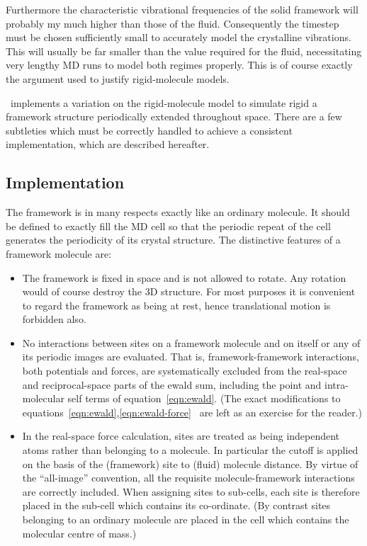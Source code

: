 Furthermore the characteristic vibrational frequencies of the solid
framework will probably my much higher than those of the fluid.
Consequently the timestep must be chosen sufficiently small to
accurately model the crystalline vibrations.  This will usually be far
smaller than the value required for the fluid, necessitating very
lengthy MD runs to model both regimes properly.  This is of course
exactly the argument used to justify rigid-molecule models. 

\moldy\ implements a variation on the rigid-molecule model to simulate
rigid a framework structure periodically extended throughout space.
There are a few subtleties which must be correctly handled to achieve
a consistent implementation, which are described hereafter.  

\subsection{Implementation}
The framework is in many respects exactly like an ordinary molecule.
It should be defined to exactly fill the MD cell so that the
periodic repeat of the cell generates the periodicity of its
crystal structure.  The distinctive features of a framework molecule are:
\begin{itemize}
\item The framework is fixed in space and is not allowed to rotate. 
Any rotation would of course destroy the 3D structure.  For most
purposes it is convenient to regard the framework as being at rest, hence
translational motion is forbidden also.
\item No interactions between sites on a framework molecule and on itself
or any of its periodic images are evaluated.  That is,
framework-framework interactions, both potentials and forces, are
systematically excluded from the real-space and reciprocal-space parts
of the ewald sum, including the point and intra-molecular self terms
of equation~\ref{eqn:ewald}. (The exact modifications to
equations~\ref{eqn:ewald},\ref{eqn:ewald-force} \etc\ are left as an
exercise for the reader.)
\item In the real-space force calculation, sites are treated as being
independent atoms rather than belonging to a molecule.  In particular
the cutoff is applied on the basis of the (framework) site to (fluid)
molecule distance.  By virtue of the ``all-image'' convention, all the
requisite molecule-framework interactions are correctly
included.  When assigning sites to sub-cells, each site is therefore
placed in the sub-cell which contains its co-ordinate.  (By contrast
sites belonging to an ordinary molecule are placed in the cell which
contains the molecular centre of mass.)
\end{itemize}

